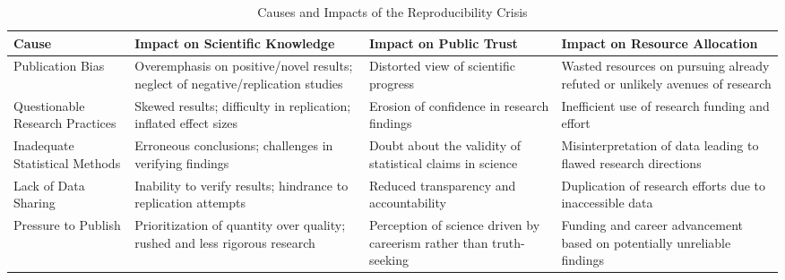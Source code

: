 \renewcommand{\arraystretch}{1.5}

\begin{table}[ht]
    \centering
    \caption{Causes and Impacts of the Reproducibility Crisis}
    \label{table:reproducibility_crisis} %
    \begin{tabularx}{\textwidth}{|X|X|X|X|}
        \hline
        Cause                                            & Impact on Scientific Knowledge                                                  & Impact on Public Trust                                              & Impact on Resource Allocation                                                                           \\
        \hline
        Publication Bias                                 & Overemphasis on positive/novel results; neglect of negative/replication studies & Distorted view of scientific progress                               & Wasted resources on pursuing already refuted or unlikely avenues of research                            \\
        \hline
        Questionable Research Practices                  & Skewed results; difficulty in replication; inflated effect sizes                & Erosion of confidence in research findings                          & Inefficient use of research funding and effort                                                          \\
        \hline
        Inadequate Statistical Methods                   & Erroneous conclusions; challenges in verifying findings                         & Doubt about the validity of statistical claims in science           & Misinterpretation of data leading to flawed research directions                                         \\
        \hline
        Lack of Data Sharing                             & Inability to verify results; hindrance to replication attempts                  & Reduced transparency and accountability                             & Duplication of research efforts due to inaccessible data                                                \\
        \hline
        Pressure to Publish                              & Prioritization of quantity over quality; rushed and less rigorous research      & Perception of science driven by careerism rather than truth-seeking & Funding and career advancement based on potentially unreliable findings                                 \\

\end{tabularx}
\end{table}
